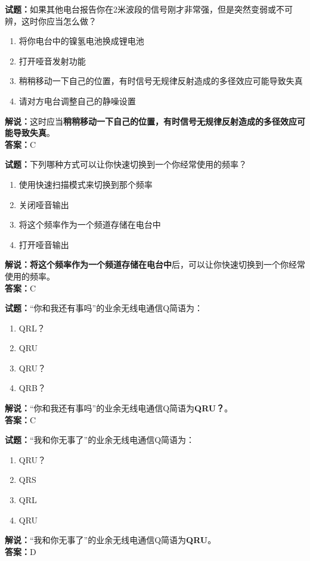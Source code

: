 \documentclass{ctexbook}
\begin{document}
\bigskip


\noindent\textbf{试题：}如果其他电台报告你在2米波段的信号刚才非常强，但是突然变弱或不可辨，这时你应当怎么做？
\begin{enumerate}[leftmargin=3em]
\item 将你电台中的镍氢电池换成锂电池
\item 打开哑音发射功能
\item 稍稍移动一下自己的位置，有时信号无规律反射造成的多径效应可能导致失真
\item 请对方电台调整自己的静噪设置
\end{enumerate}
\noindent\textbf{解说：}这时应当\textbf{稍稍移动一下自己的位置，有时信号无规律反射造成的多径效应可能导致失真}。\\\noindent\textbf{答案：}C



\bigskip


\noindent\textbf{试题：}下列哪种方式可以让你快速切换到一个你经常使用的频率？
\begin{enumerate}[leftmargin=3em]
\item 使用快速扫描模式来切换到那个频率
\item 关闭哑音输出
\item 将这个频率作为一个频道存储在电台中
\item 打开哑音输出
\end{enumerate}
\noindent\textbf{解说：}\textbf{将这个频率作为一个频道存储在电台中}后，可以让你快速切换到一个你经常使用的频率。\\\noindent\textbf{答案：}C



\bigskip


\noindent\textbf{试题：}“你和我还有事吗”的业余无线电通信Q简语为：
\begin{enumerate}[leftmargin=3em]
\item QRL？
\item QRU
\item QRU？
\item QRB？
\end{enumerate}
\noindent\textbf{解说：}“你和我还有事吗”的业余无线电通信Q简语为\textbf{QRU？}。\\\noindent\textbf{答案：}C


\bigskip


\noindent\textbf{试题：}“我和你无事了”的业余无线电通信Q简语为：
\begin{enumerate}[leftmargin=3em]
\item QRU？
\item QRS
\item QRL
\item QRU
\end{enumerate}
\noindent\textbf{解说：}“我和你无事了”的业余无线电通信Q简语为\textbf{QRU}。\\\noindent\textbf{答案：}D
\end{document}
